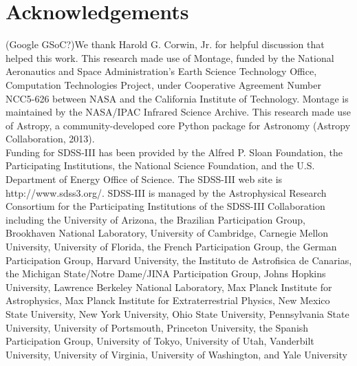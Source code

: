 \documentclass[5p]{elsarticle}
\begin{document}
\section*{Acknowledgements}
\footnotesize
\indent (Google\/ GSoC?)We thank Harold G. Corwin, Jr. for helpful discussion that helped this work. This research made use of Montage, funded by the National Aeronautics and Space Administration's Earth Science Technology Office, Computation Technologies Project, under Cooperative Agreement Number NCC5-626 between NASA and the California Institute of Technology. Montage is maintained by the NASA/IPAC Infrared Science Archive. This research made use of Astropy, a community-developed core Python package for Astronomy (Astropy Collaboration, 2013).
\\
\indent  Funding for SDSS-III has been provided by the Alfred P. Sloan Foundation, the Participating Institutions, the National Science Foundation, and the U.S. Department of Energy Office of Science. The SDSS-III web site is http://www.sdss3.org/. SDSS-III is managed by the Astrophysical Research Consortium for the Participating Institutions of the SDSS-III Collaboration including the University of Arizona, the Brazilian Participation Group, Brookhaven National Laboratory, University of Cambridge, Carnegie Mellon University, University of Florida, the French Participation Group, the German Participation Group, Harvard University, the Instituto de Astrofisica de Canarias, the Michigan State/Notre Dame/JINA Participation Group, Johns Hopkins University, Lawrence Berkeley National Laboratory, Max Planck Institute for Astrophysics, Max Planck Institute for Extraterrestrial Physics, New Mexico State University, New York University, Ohio State University, Pennsylvania State University, University of Portsmouth, Princeton University, the Spanish Participation Group, University of Tokyo, University of Utah, Vanderbilt University, University of Virginia, University of Washington, and Yale University


 
\end{document}
